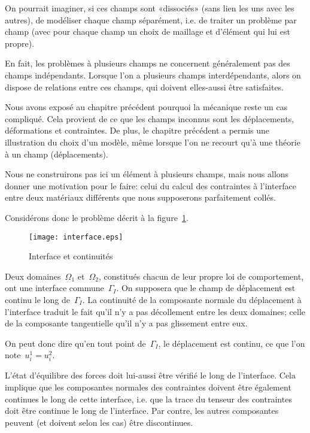 On pourrait imaginer, si ces champs sont «dissociés» (sans lien les uns avec les autres), de modéliser chaque champ séparément, i.e. de traiter un problème par champ (avec pour chaque champ un choix de maillage et d'élément qui lui est propre).

En fait, les problèmes à plusieurs champs ne concernent généralement pas des champs indépendants. Lorsque l'on a plusieurs champs interdépendants, alors on dispose de relations entre ces champs, qui doivent elles-aussi être satisfaites.

\medskip
Nous avons exposé au chapitre précédent pourquoi la mécanique reste un cas compliqué. Cela provient de ce que les champs inconnus sont les déplacements, déformations et contraintes. De plus, le chapitre précédent a permis une illustration du choix d'un modèle, même lorsque l'on ne recourt qu'à une théorie à un champ (déplacements).

\medskip
Nous ne construirons pas ici un élément à plusieurs champs, mais nous allons donner une motivation pour le faire: celui du calcul des contraintes à l'interface entre deux matériaux différents que nous supposerons parfaitement collés.

Considérons donc le problème décrit à la figure~\ref{interf}.
\begin{figure}[ht]
\centering
\texttt{[image: interface.eps]}
\caption{Interface et continuités}\label{interf}
\end{figure}
Deux domaines~$\Omega_1$ et~$\Omega_2$, constitués chacun de leur propre loi de comportement, ont une interface commune~$\Gamma_I$. On supposera que le champ de déplacement est continu le long de~$\Gamma_I$. La continuité de la composante normale du déplacement à l'interface traduit le fait qu'il n'y a pas décollement entre les deux domaines; celle de la composante tangentielle qu'il n'y a pas glissement entre eux.

On peut donc dire qu'en tout point de~$\Gamma_I$, le déplacement est continu, ce que l'on note~$u_i^1=u_i^2$.

\medskip
L'état d'équilibre des forces doit lui-aussi être vérifié le long de l'interface. Cela implique que les composantes normales des contraintes doivent être également continues le long de cette interface, i.e. que la trace du tenseur des contraintes doit être continue le long de l'interface. Par contre, les autres composantes peuvent (et doivent selon les cas) être discontinues.

